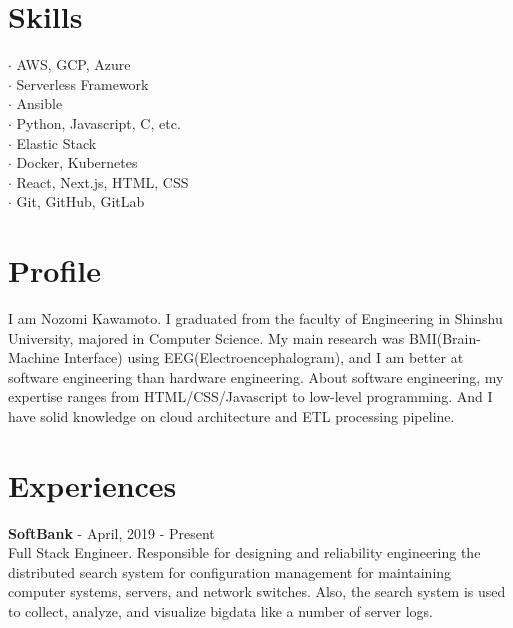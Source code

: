 \documentclass[11pt]{article} %
\begin{document}
\begin{paracol}{2}

\section{\Large Skills}
$\cdot$ AWS, GCP, Azure\\
$\cdot$ Serverless Framework\\
$\cdot$ Ansible\\
$\cdot$ Python, Javascript, C, etc.\\
$\cdot$ Elastic Stack\\
$\cdot$ Docker, Kubernetes\\
$\cdot$ React, Next.js, HTML, CSS\\
$\cdot$ Git, GitHub, GitLab\\

\switchcolumn %


\section{Profile}
I am Nozomi Kawamoto. I graduated from the faculty of Engineering in Shinshu University, majored in Computer Science. 
My main research was BMI(Brain-Machine Interface) using EEG(Electroencephalogram), and I am better at software engineering than hardware engineering.
About software engineering, my expertise ranges from HTML/CSS/Javascript to low-level programming. And I have solid knowledge on cloud architecture and ETL processing pipeline. 

\vspace{0.5cm}


\section{Experiences}
\textbf{\color{subtitle}SoftBank} \hspace{0.5mm} {\color{subtitle} - April, 2019 - Present}\\
Full Stack Engineer. Responsible for designing and reliability engineering the distributed search system 
for configuration management for maintaining computer systems, servers, and network switches. 
Also, the search system is used to collect, analyze, and visualize bigdata like a number of server logs.\\


\end{paracol}
\end{document}
